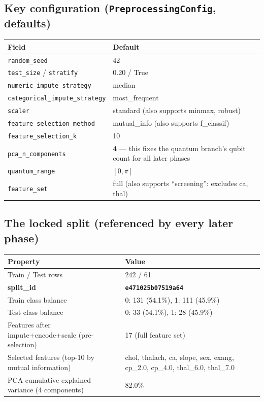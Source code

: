 \documentclass[11pt,a4paper]{article}
\newcommand{\code}[1]{\texttt{\small #1}}
\begin{document}
\subsection{Key configuration (\code{PreprocessingConfig}, defaults)}
\begin{tabularx}{\textwidth}{@{}p{4.4cm}Y@{}}
\toprule
\textbf{Field} & \textbf{Default} \\
\midrule
\code{random\_seed} & 42 \\
\code{test\_size} / \code{stratify} & 0.20 / True \\
\code{numeric\_impute\_strategy} & median \\
\code{categorical\_impute\_strategy} & most\_frequent \\
\code{scaler} & standard (also supports minmax, robust) \\
\code{feature\_selection\_method} & mutual\_info (also supports f\_classif) \\
\code{feature\_selection\_k} & 10 \\
\code{pca\_n\_components} & \textbf{4} --- this fixes the quantum branch's qubit count for all later phases \\
\code{quantum\_range} & $[0, \pi]$ \\
\code{feature\_set} & full (also supports ``screening'': excludes ca, thal) \\
\bottomrule
\end{tabularx}

\subsection{The locked split (referenced by every later phase)}
\begin{tabularx}{\textwidth}{@{}p{4.4cm}Y@{}}
\toprule
\textbf{Property} & \textbf{Value} \\
\midrule
Train / Test rows & 242 / 61 \\
\textbf{split\_id} & \textbf{\code{e471025b07519a64}} \\
Train class balance & 0: 131 (54.1\%), 1: 111 (45.9\%) \\
Test class balance & 0: 33 (54.1\%), 1: 28 (45.9\%) \\
Features after impute+encode+scale (pre-selection) & 17 (full feature set) \\
Selected features (top-10 by mutual information) & chol, thalach, ca, slope, sex, exang, cp\_2.0, cp\_4.0, thal\_6.0, thal\_7.0 \\
PCA cumulative explained variance (4 components) & 82.0\% \\
\bottomrule
\end{tabularx}
\end{document}

